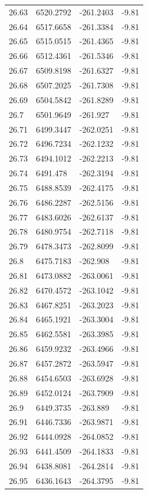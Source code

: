 \begin{table}[H]
\begin{tabular}{llll}
26.63 & 6520.2792 & -261.2403 & -9.81 \\
26.64 & 6517.6658 & -261.3384 & -9.81 \\
26.65 & 6515.0515 & -261.4365 & -9.81 \\
26.66 & 6512.4361 & -261.5346 & -9.81 \\
26.67 & 6509.8198 & -261.6327 & -9.81 \\
26.68 & 6507.2025 & -261.7308 & -9.81 \\
26.69 & 6504.5842 & -261.8289 & -9.81 \\
26.7 & 6501.9649 & -261.927 & -9.81 \\
26.71 & 6499.3447 & -262.0251 & -9.81 \\
26.72 & 6496.7234 & -262.1232 & -9.81 \\
26.73 & 6494.1012 & -262.2213 & -9.81 \\
26.74 & 6491.478 & -262.3194 & -9.81 \\
26.75 & 6488.8539 & -262.4175 & -9.81 \\
26.76 & 6486.2287 & -262.5156 & -9.81 \\
26.77 & 6483.6026 & -262.6137 & -9.81 \\
26.78 & 6480.9754 & -262.7118 & -9.81 \\
26.79 & 6478.3473 & -262.8099 & -9.81 \\
26.8 & 6475.7183 & -262.908 & -9.81 \\
26.81 & 6473.0882 & -263.0061 & -9.81 \\
26.82 & 6470.4572 & -263.1042 & -9.81 \\
26.83 & 6467.8251 & -263.2023 & -9.81 \\
26.84 & 6465.1921 & -263.3004 & -9.81 \\
26.85 & 6462.5581 & -263.3985 & -9.81 \\
26.86 & 6459.9232 & -263.4966 & -9.81 \\
26.87 & 6457.2872 & -263.5947 & -9.81 \\
26.88 & 6454.6503 & -263.6928 & -9.81 \\
26.89 & 6452.0124 & -263.7909 & -9.81 \\
26.9 & 6449.3735 & -263.889 & -9.81 \\
26.91 & 6446.7336 & -263.9871 & -9.81 \\
26.92 & 6444.0928 & -264.0852 & -9.81 \\
26.93 & 6441.4509 & -264.1833 & -9.81 \\
26.94 & 6438.8081 & -264.2814 & -9.81 \\
26.95 & 6436.1643 & -264.3795 & -9.81 \\

\end{tabular}
\end{table}
